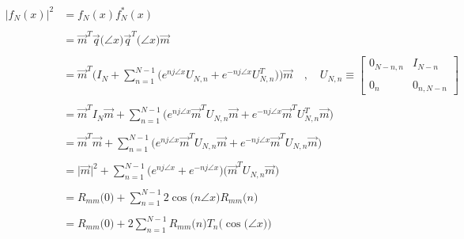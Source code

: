 \documentclass{article}
\begin{document}
\begin{align*}
    \Big|f_{N}(x)\Big|^{2}&= f_{N}(x)f^{*}_{N}(x) \\ \\
                          &= \vec{m}^{T}\vec{q}\big(\angle{x}\big)\vec{q}^{T}\big(\angle{x}\big)\vec{m} \\ \\
                          &= \vec{m}^{T}\Bigg(I_{N} + \sum_{n=1}^{N - 1}\Big(e^{nj\angle{x}}U_{N, n} + e^{-nj\angle{x}}U_{N, n}^{T}\Big)\Bigg)\vec{m} \quad , \quad U_{N, n} \equiv \begin{bmatrix}
                                                                                                                                                                                        0_{N - n, n} & I_{N - n} \\ \\
                                                                                                                                                                                        0_{n} & 0_{n, N - n}
                                                                                                                                                                                      \end{bmatrix} \\ \\
                          &= \vec{m}^{T}I_{N}\vec{m} + \sum_{n=1}^{N - 1}\Bigg(e^{nj\angle{x}}\vec{m}^{T}U_{N, n}\vec{m} + e^{-nj\angle{x}}\vec{m}^{T}U_{N, n}^{T}\vec{m}\Bigg) \\ \\
                          &= \vec{m}^{T}\vec{m} + \sum_{n=1}^{N - 1}\Bigg(e^{nj\angle{x}}\vec{m}^{T}U_{N, n}\vec{m} + e^{-nj\angle{x}}\vec{m}^{T}U_{N, n}\vec{m}\Bigg) \\ \\
                          &= \big|\vec{m}\big|^{2} + \sum_{n=1}^{N - 1}\Big(e^{nj\angle{x}} + e^{-nj\angle{x}}\Big)\Big(\vec{m}^{T}U_{N, n}\vec{m}\Big) \\ \\
                          &= R_{mm}\big(0\big) + \sum_{n=1}^{N - 1}2\cos\big(n\angle{x}\big)R_{mm}\big(n\big) \\ \\
                          &= R_{mm}\big(0\big) + 2\sum_{n=1}^{N - 1}R_{mm}\big(n\big)T_{n}\Big(\cos\big(\angle{x}\big)\Big)
\end{align*}
\end{document}
